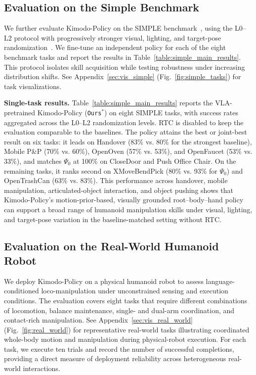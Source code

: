 \subsection{Evaluation on the Simple Benchmark}
\label{sec:exp_simple}
We further evaluate Kimodo-Policy on the SIMPLE benchmark~\cite{simple}, using the L0--L2 protocol with progressively stronger visual, lighting, and target-pose randomization~\cite{simple}. We fine-tune an independent policy for each of the eight benchmark tasks and report the results in Table~\ref{table:simple_main_results}. This protocol isolates skill acquisition while testing robustness under increasing distribution shifts. See Appendix~\ref{sec:vis_simple} (Fig.~\ref{fig:simple_tasks}) for task visualizations.



\textbf{Single-task results.} Table~\ref{table:simple_main_results} reports the VLA-pretrained Kimodo-Policy (\texttt{Ours}$^{*}$) on eight SIMPLE tasks, with success rates aggregated across the L0--L2 randomization levels. RTC is disabled to keep the evaluation comparable to the baselines. The policy attains the best or joint-best result on six tasks: it leads on Handover (83\% vs. 80\% for the strongest baseline), Mobile P\&P (70\% vs. 60\%), OpenOven (57\% vs. 53\%), and OpenFaucet (53\% vs. 33\%), and matches $\Psi_0$ at 100\% on CloseDoor and Push Office Chair. On the remaining tasks, it ranks second on XMoveBendPick (80\% vs. 93\% for $\Psi_0$) and OpenTrashCan (63\% vs. 83\%). This performance across handover, mobile manipulation, articulated-object interaction, and object pushing shows that Kimodo-Policy's motion-prior-based, visually grounded root--body--hand policy can support a broad range of humanoid manipulation skills under visual, lighting, and target-pose variation in the baseline-matched setting without RTC.



\subsection{Evaluation on the Real-World Humanoid Robot}
\label{sec:exp_real}
We deploy Kimodo-Policy on a physical humanoid robot to assess language-conditioned loco-manipulation under unconstrained sensing and execution conditions. The evaluation covers eight tasks that require different combinations of locomotion, balance maintenance, single- and dual-arm coordination, and contact-rich manipulation. See Appendix~\ref{sec:vis_real_world} (Fig.~\ref{fig:real_world}) for representative real-world tasks illustrating coordinated whole-body motion and manipulation during physical-robot execution. For each task, we execute ten trials and record the number of successful completions, providing a direct measure of deployment reliability across heterogeneous real-world interactions.



